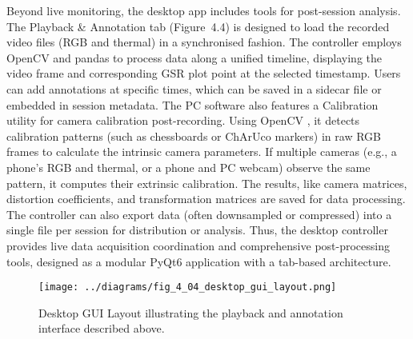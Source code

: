 Beyond live monitoring, the desktop app includes tools for post-session analysis. The Playback \& Annotation tab (Figure~4.4) is designed to load the recorded video files (RGB and thermal) in a synchronised fashion. The controller employs OpenCV and pandas to process data along a unified timeline, displaying the video frame and corresponding GSR plot point at the selected timestamp. Users can add annotations at specific times, which can be saved in a sidecar file or embedded in session metadata. The PC software also features a Calibration utility for camera calibration post-recording. Using OpenCV \cite{ref22}, it detects calibration patterns (such as chessboards or ChArUco markers) in raw RGB frames to calculate the intrinsic camera parameters. If multiple cameras (e.g., a phone’s RGB and thermal, or a phone and PC webcam) observe the same pattern, it computes their extrinsic calibration. The results, like camera matrices, distortion coefficients, and transformation matrices are saved for data processing. The controller can also export data (often downsampled or compressed) into a single file per session for distribution or analysis. Thus, the desktop controller provides live data acquisition coordination and comprehensive post-processing tools, designed as a modular PyQt6 application with a tab-based architecture.

\begin{figure}[htbp]
    \centring
    \texttt{[image: ../diagrams/fig\_4\_04\_desktop\_gui\_layout.png]}
    \caption{Desktop GUI Layout illustrating the playback and annotation interface described above.}
    \label{fig:4_04_desktop_gui_layout}
\end{figure}


